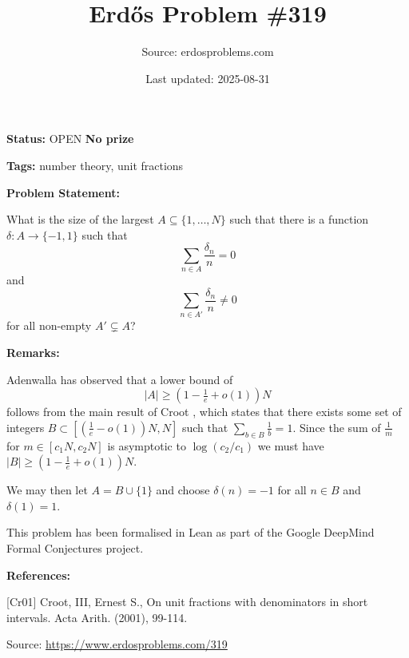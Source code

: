 \documentclass{article}
\title{Erd\H{o}s Problem \#319}
\date{Last updated: 2025-08-31}
\author{Source: erdosproblems.com}
\begin{document}
\maketitle

\noindent\textbf{Status:} OPEN \quad \textbf{No prize}

\noindent\textbf{Tags:} number theory, unit fractions

\medskip
\noindent\textbf{Problem Statement:}

What is the size of the largest $A\subseteq \{1,\ldots,N\}$ such that there is a function $\delta:A\to \{-1,1\}$ such that\[\sum_{n\in A}\frac{\delta_n}{n}=0\]and\[\sum_{n\in A'}\frac{\delta_n}{n}\neq 0\]for all non-empty $A'\subsetneq A$?

\bigskip
\noindent\textbf{Remarks:}

Adenwalla has observed that a lower bound of\[\lvert A\rvert\geq (1-\tfrac{1}{e}+o(1))N\]follows from the main result of Croot \cite{Cr01}, which states that there exists some set of integers $B\subset [(\frac{1}{e}-o(1))N,N]$ such that $\sum_{b\in B}\frac{1}{b}=1$. Since the sum of $\frac{1}{m}$ for $m\in [c_1N,c_2N]$ is asymptotic to $\log(c_2/c_1)$ we must have $\lvert B\rvert \geq (1-\tfrac{1}{e}+o(1))N$.

We may then let $A=B\cup\{1\}$ and choose $\delta(n)=-1$ for all $n\in B$ and $\delta(1)=1$. 

This problem has been formalised in Lean as part of the Google DeepMind Formal Conjectures project.

\bigskip
\noindent\textbf{References:}

[Cr01] Croot, III, Ernest S., On unit fractions with denominators in short intervals. Acta Arith. (2001), 99-114.

\bigskip
\noindent\small{Source: \url{https://www.erdosproblems.com/319}}
\end{document}
